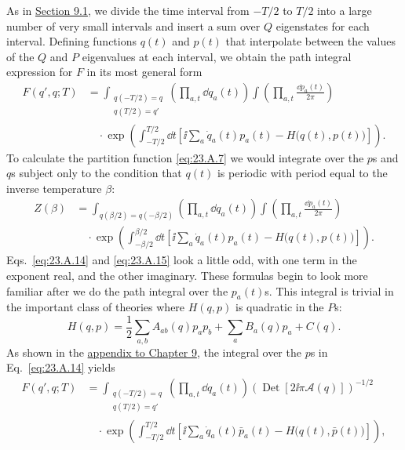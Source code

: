 As in \hyperref[sec:9.1]{Section 9.1}, we divide the time interval from $-T/2$ to $T/2$ into a large number of very small intervals and insert a sum over $Q$ eigenstates for each interval. Defining functions $q(t)$ and $p(t)$ that interpolate between the values of the $Q$ and $P$ eigenvalues at each interval, we obtain the path integral expression for $F$ in its most general form
\begin{equation}
\begin{aligned}
 F(q',q;T)
 &=
 \int_{\substack{q(-T/2)=q\\q(T/2)=q'}}
 \left(\prod_{a,t}\dd q_a(t)\right)
 \int\left(\prod_{a,t}\frac{\dd p_a(t)}{2\pi}\right)\\
 &\quad{}\cdot
 \exp\left(
 \int_{-T/2}^{T/2}\dd t
 \left[
 \ii\sum_a\dot q_a(t)p_a(t)-H\bigl(q(t),p(t)\bigr)
 \right]
 \right).
\end{aligned}
 \tag{23.A.14}\label{eq:23.A.14}
\end{equation}
To calculate the partition function \eqref{eq:23.A.7} we would integrate over the $p$s and $q$s subject only to the condition that $q(t)$ is periodic with period equal to the inverse temperature $\beta$:
\begin{equation}
\begin{aligned}
 Z(\beta)
 &=
 \int_{q(\beta/2)=q(-\beta/2)}
 \left(\prod_{a,t}\dd q_a(t)\right)
 \int\left(\prod_{a,t}\frac{\dd p_a(t)}{2\pi}\right)\\
 &\quad{}\cdot
 \exp\left(
 \int_{-\beta/2}^{\beta/2}\dd t
 \left[
 \ii\sum_a\dot q_a(t)p_a(t)-H\bigl(q(t),p(t)\bigr)
 \right]
 \right).
\end{aligned}
 \tag{23.A.15}\label{eq:23.A.15}
\end{equation}
Eqs.~\eqref{eq:23.A.14} and \eqref{eq:23.A.15} look a little odd, with one term in the exponent real, and the other imaginary. These formulas begin to look more familiar after we do the path integral over the $p_a(t)$s. This integral is trivial in the important class of theories where $H(q,p)$ is quadratic in the $P$s:
\begin{equation}
 H(q,p)=\frac{1}{2}\sum_{a,b}A_{ab}(q)p_ap_b
 +\sum_aB_a(q)p_a+C(q).
 \tag{23.A.16}\label{eq:23.A.16}
\end{equation}
As shown in the \hyperref[app:9]{appendix to Chapter 9}, the integral over the $p$s in Eq.~\eqref{eq:23.A.14} yields
\begin{equation}
\begin{aligned}
 F(q',q;T)
 &=
 \int_{\substack{q(-T/2)=q\\q(T/2)=q'}}
 \left(\prod_{a,t}\dd q_a(t)\right)
 \left(\operatorname{Det}\left[2\ii\pi\mathcal A(q)\right]\right)^{-1/2}\\
 &\quad{}\cdot
 \exp\left(
 \int_{-T/2}^{T/2}\dd t
 \left[
 \ii\sum_a\dot q_a(t)\bar p_a(t)
 -H\bigl(q(t),\bar p(t)\bigr)
 \right]
 \right),
\end{aligned}
 \tag{23.A.17}\label{eq:23.A.17}
\end{equation}
